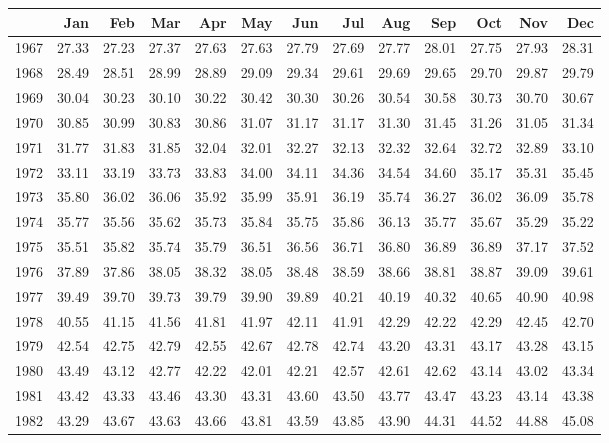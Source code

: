 \begin{longtable}{rrrrrrrrrrrrr}
  \hline
 & Jan & Feb & Mar & Apr & May & Jun & Jul & Aug & Sep & Oct & Nov & Dec \\ 
  \hline
1967 & 27.33 & 27.23 & 27.37 & 27.63 & 27.63 & 27.79 & 27.69 & 27.77 & 28.01 & 27.75 & 27.93 & 28.31 \\ 
  1968 & 28.49 & 28.51 & 28.99 & 28.89 & 29.09 & 29.34 & 29.61 & 29.69 & 29.65 & 29.70 & 29.87 & 29.79 \\ 
  1969 & 30.04 & 30.23 & 30.10 & 30.22 & 30.42 & 30.30 & 30.26 & 30.54 & 30.58 & 30.73 & 30.70 & 30.67 \\ 
  1970 & 30.85 & 30.99 & 30.83 & 30.86 & 31.07 & 31.17 & 31.17 & 31.30 & 31.45 & 31.26 & 31.05 & 31.34 \\ 
  1971 & 31.77 & 31.83 & 31.85 & 32.04 & 32.01 & 32.27 & 32.13 & 32.32 & 32.64 & 32.72 & 32.89 & 33.10 \\ 
  1972 & 33.11 & 33.19 & 33.73 & 33.83 & 34.00 & 34.11 & 34.36 & 34.54 & 34.60 & 35.17 & 35.31 & 35.45 \\ 
  1973 & 35.80 & 36.02 & 36.06 & 35.92 & 35.99 & 35.91 & 36.19 & 35.74 & 36.27 & 36.02 & 36.09 & 35.78 \\ 
  1974 & 35.77 & 35.56 & 35.62 & 35.73 & 35.84 & 35.75 & 35.86 & 36.13 & 35.77 & 35.67 & 35.29 & 35.22 \\ 
  1975 & 35.51 & 35.82 & 35.74 & 35.79 & 36.51 & 36.56 & 36.71 & 36.80 & 36.89 & 36.89 & 37.17 & 37.52 \\ 
  1976 & 37.89 & 37.86 & 38.05 & 38.32 & 38.05 & 38.48 & 38.59 & 38.66 & 38.81 & 38.87 & 39.09 & 39.61 \\ 
  1977 & 39.49 & 39.70 & 39.73 & 39.79 & 39.90 & 39.89 & 40.21 & 40.19 & 40.32 & 40.65 & 40.90 & 40.98 \\ 
  1978 & 40.55 & 41.15 & 41.56 & 41.81 & 41.97 & 42.11 & 41.91 & 42.29 & 42.22 & 42.29 & 42.45 & 42.70 \\ 
  1979 & 42.54 & 42.75 & 42.79 & 42.55 & 42.67 & 42.78 & 42.74 & 43.20 & 43.31 & 43.17 & 43.28 & 43.15 \\ 
  1980 & 43.49 & 43.12 & 42.77 & 42.22 & 42.01 & 42.21 & 42.57 & 42.61 & 42.62 & 43.14 & 43.02 & 43.34 \\ 
  1981 & 43.42 & 43.33 & 43.46 & 43.30 & 43.31 & 43.60 & 43.50 & 43.77 & 43.47 & 43.23 & 43.14 & 43.38 \\ 
  1982 & 43.29 & 43.67 & 43.63 & 43.66 & 43.81 & 43.59 & 43.85 & 43.90 & 44.31 & 44.52 & 44.88 & 45.08 \\ 

\end{longtable}
